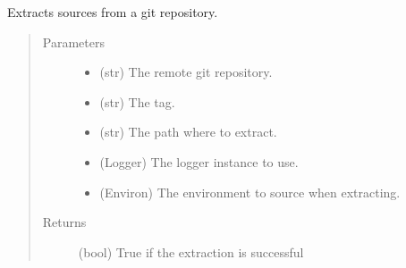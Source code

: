 \documentclass[a4paper,10pt,english]{sphinxmanual}
\begin{document}

\begin{fulllineitems}
\label{\detokenize{apidoc_src/src:src.system.git_extract}}
Extracts sources from a git repository.
\begin{quote}\begin{description}
\item[{Parameters}] \leavevmode\begin{itemize}
\item {} 
 \textendash{} (str) The remote git repository.

\item {} 
 \textendash{} (str) The tag.

\item {} 
 \textendash{} (str) The path where to extract.

\item {} 
 \textendash{} (Logger) The logger instance to use.

\item {} 
 \textendash{} (Environ) 
The environment to source when extracting.

\end{itemize}

\item[{Returns}] \leavevmode
(bool) True if the extraction is successful

\end{description}\end{quote}

\end{fulllineitems}

\end{document}
